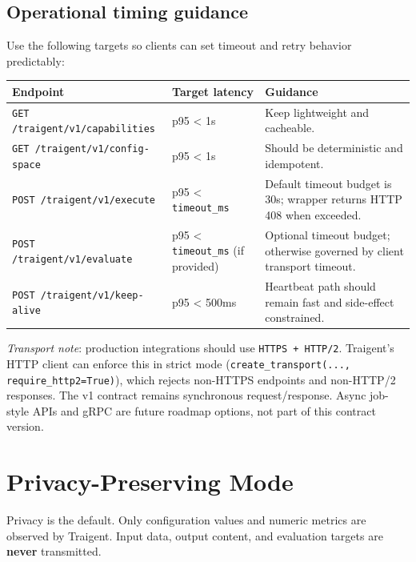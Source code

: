 \documentclass[11pt,a4paper]{article}
\newcommand{\field}[1]{\texttt{#1}}
\begin{document}
\subsection{Operational timing guidance}

Use the following targets so clients can set timeout and retry behavior predictably:

\begin{center}\small
\begin{tabularx}{\textwidth}{@{}llX@{}}
\toprule
\textbf{Endpoint} & \textbf{Target latency} & \textbf{Guidance} \\
\midrule
\texttt{GET /traigent/v1/capabilities} & p95 \textless{} 1s & Keep lightweight and cacheable. \\
\texttt{GET /traigent/v1/config-space} & p95 \textless{} 1s & Should be deterministic and idempotent. \\
\texttt{POST /traigent/v1/execute} & p95 \textless{} \field{timeout\_ms} & Default timeout budget is 30s; wrapper returns HTTP 408 when exceeded. \\
\texttt{POST /traigent/v1/evaluate} & p95 \textless{} \field{timeout\_ms} (if provided) & Optional timeout budget; otherwise governed by client transport timeout. \\
\texttt{POST /traigent/v1/keep-alive} & p95 \textless{} 500ms & Heartbeat path should remain fast and side-effect constrained. \\
\bottomrule
\end{tabularx}
\end{center}

\textit{Transport note}: production integrations should use \texttt{HTTPS + HTTP/2}.
Traigent's HTTP client can enforce this in strict mode
(\texttt{create\_transport(..., require\_http2=True)}), which rejects non-HTTPS
endpoints and non-HTTP/2 responses. The v1 contract remains synchronous
request/response. Async job-style APIs and gRPC are future roadmap options, not
part of this contract version.

\section{Privacy-Preserving Mode}\label{sec:privacy}

Privacy is the default. Only configuration values and numeric metrics are
observed by Traigent. Input data, output content, and evaluation targets are
\textbf{never} transmitted.
\end{document}
